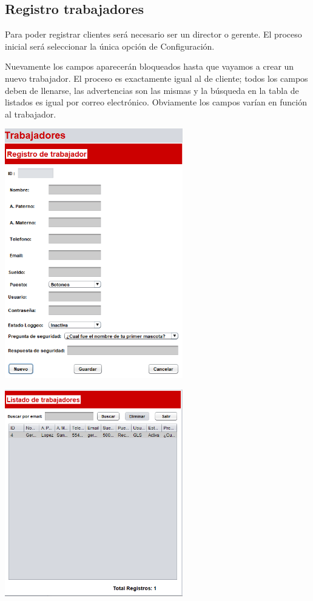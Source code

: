 \documentclass[12pt]{article}
\begin{document}
\begin{flushleft}
\section{Registro trabajadores}
\textsf{Para poder registrar clientes será necesario ser un director o gerente. El proceso inicial será seleccionar la única opción de Configuración.}

\vspace{0.5cm}
\textsf{Nuevamente los campos aparecerán bloqueados hasta que vayamos a crear un nuevo trabajador. El proceso es exactamente igual al de cliente; todos los campos deben de llenarse, las advertencias son las mismas y la búsqueda en la tabla de listados es igual por correo electrónico. Obviamente los campos varían en función al trabajador.}
\vspace{0.5cm}
\begin{center}
\includegraphics[width=7.75cm]{trabajador.png}
\end{center}

\vspace{0.5cm}
\begin{center}
\includegraphics[width=7.75cm]{lis_trabajador.png}
\end{center}










\end{flushleft}
\end{document}
